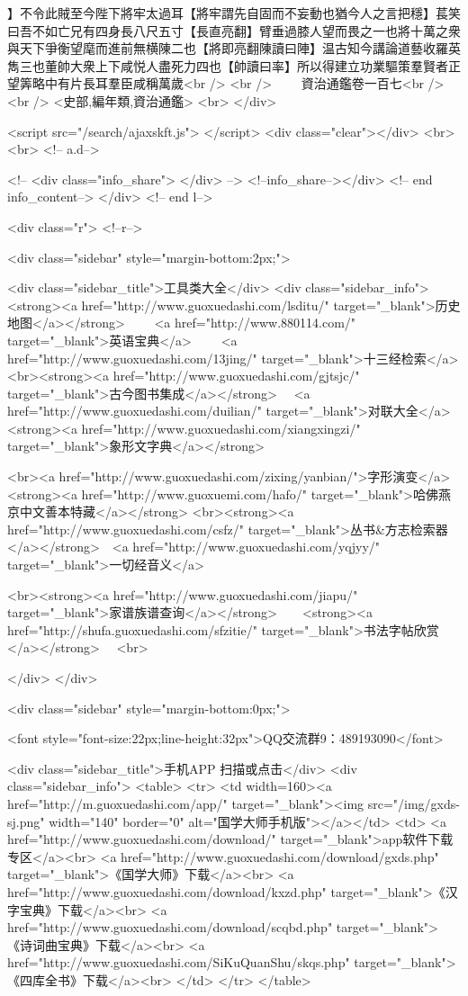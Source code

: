 】不令此賊至今陛下將牢太過耳【將牢謂先自固而不妄動也猶今人之言把穩】萇笑曰吾不如亡兄有四身長八尺五寸【長直亮翻】臂垂過膝人望而畏之一也將十萬之衆與天下爭衡望麾而進前無横陳二也【將即亮翻陳讀曰陣】温古知今講論道藝收羅英雋三也董帥大衆上下咸悦人盡死力四也【帥讀曰率】所以得建立功業驅策羣賢者正望筭略中有片長耳羣臣咸稱萬歲<br />
<br />
　　資治通鑑卷一百七<br />
<br />
<史部,編年類,資治通鑑>  <br>
   </div> 

<script src="/search/ajaxskft.js"> </script>
 <div class="clear"></div>
<br>
<br>
 <!-- a.d-->

 <!--
<div class="info_share">
</div> 
-->
 <!--info_share--></div>   <!-- end info_content-->
  </div> <!-- end l-->

<div class="r">   <!--r-->



<div class="sidebar"  style="margin-bottom:2px;">

 
<div class="sidebar_title">工具类大全</div>
<div class="sidebar_info">
<strong><a href="http://www.guoxuedashi.com/lsditu/" target="_blank">历史地图</a></strong>　　
<a href="http://www.880114.com/" target="_blank">英语宝典</a>　　
<a href="http://www.guoxuedashi.com/13jing/" target="_blank">十三经检索</a>　
<br><strong><a href="http://www.guoxuedashi.com/gjtsjc/" target="_blank">古今图书集成</a></strong>　
<a href="http://www.guoxuedashi.com/duilian/" target="_blank">对联大全</a>　<strong><a href="http://www.guoxuedashi.com/xiangxingzi/" target="_blank">象形文字典</a></strong>　

<br><a href="http://www.guoxuedashi.com/zixing/yanbian/">字形演变</a>　　<strong><a href="http://www.guoxuemi.com/hafo/" target="_blank">哈佛燕京中文善本特藏</a></strong>
<br><strong><a href="http://www.guoxuedashi.com/csfz/" target="_blank">丛书&方志检索器</a></strong>　<a href="http://www.guoxuedashi.com/yqjyy/" target="_blank">一切经音义</a>　　

<br><strong><a href="http://www.guoxuedashi.com/jiapu/" target="_blank">家谱族谱查询</a></strong>　　<strong><a href="http://shufa.guoxuedashi.com/sfzitie/" target="_blank">书法字帖欣赏</a></strong>　
<br>

</div>
</div>


<div class="sidebar" style="margin-bottom:0px;">

<font style="font-size:22px;line-height:32px">QQ交流群9：489193090</font>


<div class="sidebar_title">手机APP 扫描或点击</div>
<div class="sidebar_info">
<table>
<tr>
	<td width=160><a href="http://m.guoxuedashi.com/app/" target="_blank"><img src="/img/gxds-sj.png" width="140"  border="0" alt="国学大师手机版"></a></td>
	<td>
<a href="http://www.guoxuedashi.com/download/" target="_blank">app软件下载专区</a><br>
<a href="http://www.guoxuedashi.com/download/gxds.php" target="_blank">《国学大师》下载</a><br>
<a href="http://www.guoxuedashi.com/download/kxzd.php" target="_blank">《汉字宝典》下载</a><br>
<a href="http://www.guoxuedashi.com/download/scqbd.php" target="_blank">《诗词曲宝典》下载</a><br>
<a href="http://www.guoxuedashi.com/SiKuQuanShu/skqs.php" target="_blank">《四库全书》下载</a><br>
</td>
</tr>
</table>

